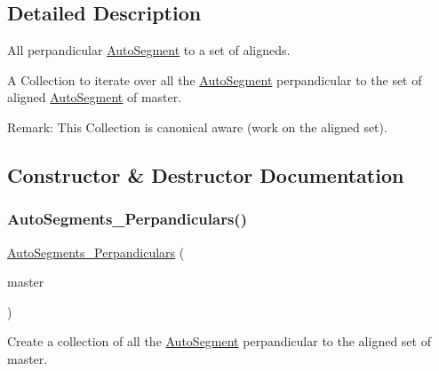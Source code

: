 \subsection{Detailed Description}
All perpandicular \mbox{\hyperlink{classKatabatic_1_1AutoSegment}{Auto\+Segment}} to a set of aligneds. 

A Collection to iterate over all the \mbox{\hyperlink{classKatabatic_1_1AutoSegment}{Auto\+Segment}} perpandicular to the set of aligned \mbox{\hyperlink{classKatabatic_1_1AutoSegment}{Auto\+Segment}} of {\ttfamily master}.

\begin{DoxyParagraph}{Remark\+: This Collection is canonical aware (work on the aligned set).}

\end{DoxyParagraph}


\subsection{Constructor \& Destructor Documentation}
\mbox{\label{classKatabatic_1_1AutoSegments__Perpandiculars_ab5cb1a0042b95cb6bd56997cdfbf0e6f}} 
\subsubsection{\texorpdfstring{Auto\+Segments\+\_\+\+Perpandiculars()}{AutoSegments\_Perpandiculars()}\hspace{0.1cm}{\footnotesize\ttfamily [1/2]}}
{\footnotesize\ttfamily \mbox{\hyperlink{classKatabatic_1_1AutoSegments__Perpandiculars}{Auto\+Segments\+\_\+\+Perpandiculars}} (\begin{DoxyParamCaption}\item[{\mbox{\hyperlink{classKatabatic_1_1AutoSegment}{Auto\+Segment}} $\ast$}]{master }\end{DoxyParamCaption})\hspace{0.3cm}{\ttfamily [inline]}}

Create a collection of all the \mbox{\hyperlink{classKatabatic_1_1AutoSegment}{Auto\+Segment}} perpandicular to the aligned set of {\ttfamily master}. \mbox{\label{classKatabatic_1_1AutoSegments__Perpandiculars_ac2d21dfaa510352fb5c1bd9aa9bd6f94}} 
